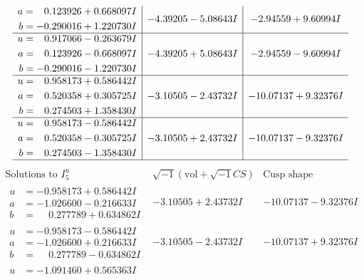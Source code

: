 \documentclass[1p]{elsarticle_modified}
\theoremstyle{definition}
\newcommand{\I}{\sqrt{-1}}
\begin{document}
$$\begin{array}{c|c|c}
\begin{aligned}
a &= \phantom{-}0.123926 + 0.668097 I \\
b &= -0.290016 + 1.220730 I\end{aligned}
 & -4.39205 - 5.08643 I & -2.94559 + 9.60994 I \\ \hline\begin{aligned}
u &= \phantom{-}0.917066 - 0.263679 I \\
a &= \phantom{-}0.123926 - 0.668097 I \\
b &= -0.290016 - 1.220730 I\end{aligned}
 & -4.39205 + 5.08643 I & -2.94559 - 9.60994 I \\ \hline\begin{aligned}
u &= \phantom{-}0.958173 + 0.586442 I \\
a &= \phantom{-}0.520358 + 0.305725 I \\
b &= \phantom{-}0.274503 + 1.358430 I\end{aligned}
 & -3.10505 - 2.43732 I & -10.07137 + 9.32376 I \\ \hline\begin{aligned}
u &= \phantom{-}0.958173 - 0.586442 I \\
a &= \phantom{-}0.520358 - 0.305725 I \\
b &= \phantom{-}0.274503 - 1.358430 I\end{aligned}
 & -3.10505 + 2.43732 I & -10.07137 - 9.32376 I\\
 \hline 
 \end{array}$$\newpage$$\begin{array}{c|c|c}  
\text{Solutions to }I^u_{5}& \I (\text{vol} + \sqrt{-1}CS) & \text{Cusp shape}\\
 \hline 
\begin{aligned}
u &= -0.958173 + 0.586442 I \\
a &= -1.026600 - 0.216633 I \\
b &= \phantom{-}0.277789 + 0.634862 I\end{aligned}
 & -3.10505 + 2.43732 I & -10.07137 - 9.32376 I \\ \hline\begin{aligned}
u &= -0.958173 - 0.586442 I \\
a &= -1.026600 + 0.216633 I \\
b &= \phantom{-}0.277789 - 0.634862 I\end{aligned}
 & -3.10505 - 2.43732 I & -10.07137 + 9.32376 I \\ \hline\begin{aligned}
u &= -1.091460 + 0.565363 I \\

\end{aligned}
\end{array}$$
\end{document}
